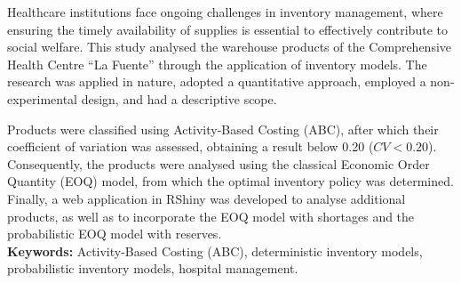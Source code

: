 \begin{abs}
\justifying
Healthcare institutions face ongoing challenges in inventory management, where ensuring the timely availability of supplies is essential to effectively contribute to social welfare. This study analysed the warehouse products of the Comprehensive Health Centre “La Fuente” through the application of inventory models. The research was applied in nature, adopted a quantitative approach, employed a non-experimental design, and had a descriptive scope.

Products were classified using Activity-Based Costing (ABC), after which their coefficient of variation was assessed, obtaining a result below 0.20 ($CV < 0.20$). Consequently, the products were analysed using the classical Economic Order Quantity (EOQ) model, from which the optimal inventory policy was determined. Finally, a web application in RShiny was developed to analyse additional products, as well as to incorporate the EOQ model with shortages and the probabilistic EOQ model with reserves. \\
\textbf{Keywords:}
Activity-Based Costing (ABC), deterministic inventory models, probabilistic inventory models, hospital management.

\end{abs}
